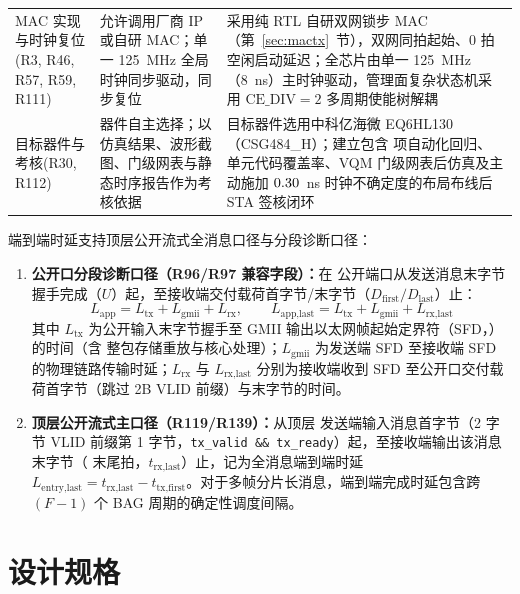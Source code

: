 \begin{table}
\begin{tabularx}{\linewidth}{>{\raggedright\arraybackslash}p{2.4cm}>{\raggedright\arraybackslash}p{4.5cm}L}
MAC 实现与时钟复位\newline (R3, R46, R57, R59, R111) & 允许调用厂商 IP 或自研 MAC；单一 125~MHz 全局时钟同步驱动，同步复位 & 采用纯 RTL 自研双网锁步 MAC（第~\ref{sec:mactx}~节），双网同拍起始、0 拍空闲启动延迟；全芯片由单一 125~MHz（8~ns）主时钟驱动，管理面复杂状态机采用 $\text{CE\_DIV}=2$ 多周期使能树解耦 \\
目标器件与考核\newline (R30, R112) & 器件自主选择；以仿真结果、波形截图、门级网表与静态时序报告作为考核依据 & 目标器件选用中科亿海微 EQ6HL130（CSG484\_H）；建立包含 \RegCount{} 项自动化回归、\DesignUnitCount{} 单元代码覆盖率、VQM 门级网表后仿真及主动施加 $0.30$~ns 时钟不确定度的布局布线后 STA 签核闭环 \\
\bottomrule
\end{tabularx}
\end{table}

端到端时延支持顶层公开流式全消息口径与分段诊断口径：
\begin{enumerate}[leftmargin=2em,itemsep=1pt]
  \item \textbf{公开口分段诊断口径（R96/R97 兼容字段）：}在  公开端口从发送消息末字节握手完成（$U$）起，至接收端交付载荷首字节/末字节（$D_\text{first}/D_\text{last}$）止：
\begin{equation}
L_\text{app} = L_\text{tx} + L_\text{gmii} + L_\text{rx},\qquad L_\text{app,last} = L_\text{tx} + L_\text{gmii} + L_\text{rx,last}
\end{equation}
其中 $L_\text{tx}$ 为公开输入末字节握手至 GMII 输出以太网帧起始定界符（SFD，）的时间（含  整包存储重放与核心处理）；$L_\text{gmii}$ 为发送端 SFD 至接收端 SFD 的物理链路传输时延；$L_\text{rx}$ 与 $L_\text{rx,last}$ 分别为接收端收到 SFD 至公开口交付载荷首字节（跳过 2B VLID 前缀）与末字节的时间。
  \item \textbf{顶层公开流式主口径（R119/R139）：}从顶层  发送端输入消息首字节（2 字节 VLID 前缀第 1 字节，\texttt{tx\_valid \&\& tx\_ready}）起，至接收端输出该消息末字节（ 末尾拍，$t_\text{rx,last}$）止，记为全消息端到端时延 $L_\text{entry,last} = t_\text{rx,last} - t_\text{tx,first}$。对于多帧分片长消息，端到端完成时延包含跨 $(F-1)$ 个 BAG 周期的确定性调度间隔。
\end{enumerate}

\FloatBarrier
\section{设计规格}

